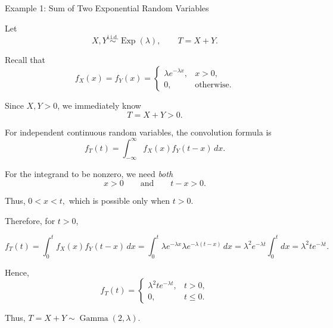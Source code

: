 \begin{frame}{Example 1: Sum of Two Exponential Random Variables}

\small

Let
\[
X,Y\overset{\text{i.i.d.}}{\sim}\operatorname{Exp}(\lambda),
\qquad
T=X+Y.
\]

Recall that
\[
f_X(x)=f_Y(x)
=
\begin{cases}
\lambda e^{-\lambda x}, & x>0,\\
0, & \text{otherwise}.
\end{cases}
\]

Since $X,Y>0$, we immediately know
\[
T=X+Y>0.
\]

For independent continuous random variables, the convolution formula is
\[
f_T(t)
=
\int_{-\infty}^{\infty}
f_X(x)f_Y(t-x)\,dx.
\]

For the integrand to be nonzero, we need \emph{both}
\[
x>0
\qquad\text{and}\qquad
t-x>0.
\]

Thus, $0<x<t,$ which is possible only when $t>0$.

Therefore, for $t>0$,
 
\begin{equation}
f_T(t)
=
\int_0^t
f_X(x)f_Y(t-x)\,dx =
\int_0^t
\lambda e^{-\lambda x}
\lambda e^{-\lambda(t-x)}
\,dx =
\lambda^2e^{-\lambda t}\int_0^t dx =
\lambda^2te^{-\lambda t}.
\end{equation}
 

Hence,
\[
f_T(t)
=
\begin{cases}
\lambda^2te^{-\lambda t}, & t>0,\\
0, & t\le0.
\end{cases}
\]
 
Thus, $T=X+Y\sim\operatorname{Gamma}(2,\lambda).$
 

\end{frame}


